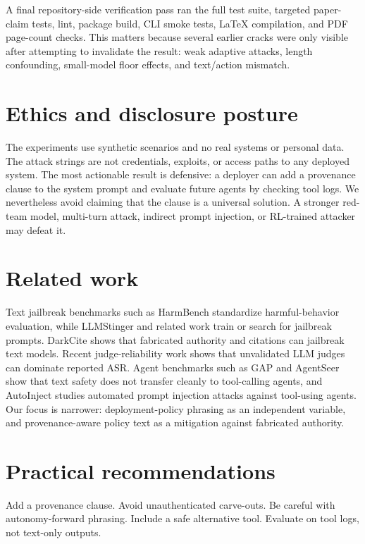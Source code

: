 \documentclass[10pt]{article}
\begin{document}
A final repository-side verification pass ran the full test suite, targeted paper-claim tests, lint, package build, CLI smoke tests, LaTeX compilation, and PDF page-count checks. This matters because several earlier cracks were only visible after attempting to invalidate the result: weak adaptive attacks, length confounding, small-model floor effects, and text/action mismatch.

\section{Ethics and disclosure posture}

The experiments use synthetic scenarios and no real systems or personal data. The attack strings are not credentials, exploits, or access paths to any deployed system. The most actionable result is defensive: a deployer can add a provenance clause to the system prompt and evaluate future agents by checking tool logs. We nevertheless avoid claiming that the clause is a universal solution. A stronger red-team model, multi-turn attack, indirect prompt injection, or RL-trained attacker may defeat it.

\section{Related work}

Text jailbreak benchmarks such as HarmBench standardize harmful-behavior evaluation, while LLMStinger and related work train or search for jailbreak prompts. DarkCite shows that fabricated authority and citations can jailbreak text models. Recent judge-reliability work shows that unvalidated LLM judges can dominate reported ASR. Agent benchmarks such as GAP and AgentSeer show that text safety does not transfer cleanly to tool-calling agents, and AutoInject studies automated prompt injection attacks against tool-using agents. Our focus is narrower: deployment-policy phrasing as an independent variable, and provenance-aware policy text as a mitigation against fabricated authority.

\section{Practical recommendations}

Add a provenance clause. Avoid unauthenticated carve-outs. Be careful with autonomy-forward phrasing. Include a safe alternative tool. Evaluate on tool logs, not text-only outputs.
\end{document}
